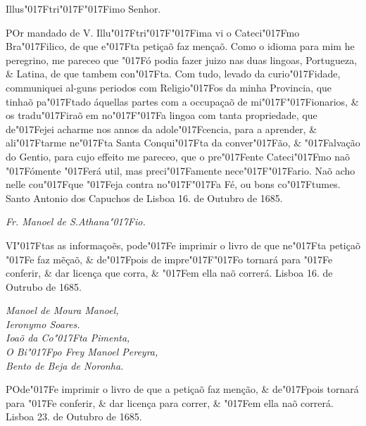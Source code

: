 \documentclass[openany,titlepage,12pt]{book}
\newcommand{\lgS}{\char"017F}
\newcommand{\lgSS}{\char"017F\char"017F}
\begin{document}
\begin{center}
    Illus\lgS tri\lgSS imo Senhor.
\end{center}
\vspace*{-4pt}

\lettrine[findent=2pt, nindent=0pt, lines=2]
{P}{O}r mandado de V. Illu\lgS tri\lgSS ima vi o\linebreak
Cateci\lgS mo Bra\lgS ilico, de que e\lgS ta petiçaõ
faz mençaõ. Como o idioma para mim he
peregrino, me pareceo que \lgS ó podia fazer juizo
nas duas lingoas, Portugueza, \& Latina, de que tambem con\lgS ta.
Com tudo, levado da curio\lgS idade, communiquei 
al-\linebreak guns periodos
com Religio\lgS os da minha\linebreak
Provincia, que tinhaõ pa\lgS tado
áquellas partes com a occupaçaõ de mi\lgSS ionarios, \& os
tradu\lgS iraõ em no\lgSS a lingoa com tanta propriedade, que 
de\lgS ejei acharme nos annos da adole\lgS cencia, para a aprender,
\& ali\lgS tarme ne\lgS ta Santa Conqui\lgS ta da conver\lgS ão,
\& \lgS alvação do Gentio, para cujo effeito me pareceo, que o 
pre\lgS ente Cateci\lgS mo naõ \lgS ómente \lgS erá util, mas
preci\lgS amente nece\lgSS ario. Naõ acho nelle cou\lgS que
\lgS eja contra no\lgSS a Fé, ou bons co\lgS tumes. Santo Antonio
dos Capuchos de Lisboa 16. de Outubro de 1685.

\begin{center}
    \hspace{60pt}\textit{Fr. Manoel de S.Athana\lgS io.}
\end{center}

\lettrine[findent=2pt, nindent=0pt, lines=2]
{V}{I}\lgS tas as informaçoẽs, pode\lgS e imprimir o livro de que
ne\lgS ta petiçaõ \lgS e faz mẽçaõ, \& de\lgS pois de
impre\lgSS o tornará para \lgS e conferir,
\& dar licença que corra, \&
\lgS em ella naõ correrá. Lisboa 16. de Outrubo de 1685.
\vspace{\baselineskip}
\begin{adjustwidth}{30pt}{0pt}
    \textit{Manoel de Moura Manoel,\\
    Ieronymo Soares.\\
    Ioaõ da Co\lgS ta Pimenta,\\
    O Bi\lgS po Frey Manoel Pereyra,\\
    Bento de Beja de Noronha.}
\end{adjustwidth}
\vspace{\baselineskip}
\lettrine[findent=2pt, nindent=0pt, lines=2]
{P}{O}de\lgS e imprimir o livro de que a petiçaõ faz menção, \& 
de\lgS pois tornará para \lgS e conferir, \&
dar licença para correr, \& \lgS em ella naõ correrá. Lisboa 23.
de Outubro de 1685.
\end{document}
